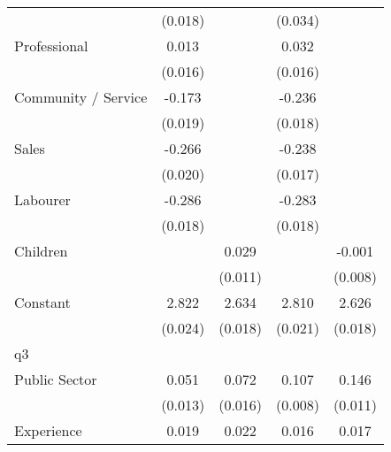 {\begin{tabular}{l*{4}{c}}
                    &     (0.018)         &                     &     (0.034)         &                     \\
[1em]
Professional        &       0.013         &                     &       0.032\sym{*}  &                     \\
                    &     (0.016)         &                     &     (0.016)         &                     \\
[1em]
Community / Service &      -0.173\sym{***}&                     &      -0.236\sym{***}&                     \\
                    &     (0.019)         &                     &     (0.018)         &                     \\
[1em]
Sales               &      -0.266\sym{***}&                     &      -0.238\sym{***}&                     \\
                    &     (0.020)         &                     &     (0.017)         &                     \\
[1em]
Labourer            &      -0.286\sym{***}&                     &      -0.283\sym{***}&                     \\
                    &     (0.018)         &                     &     (0.018)         &                     \\
[1em]
Children            &                     &       0.029\sym{**} &                     &      -0.001         \\
                    &                     &     (0.011)         &                     &     (0.008)         \\
[1em]
Constant            &       2.822\sym{***}&       2.634\sym{***}&       2.810\sym{***}&       2.626\sym{***}\\
                    &     (0.024)         &     (0.018)         &     (0.021)         &     (0.018)         \\
\hline
q3                  &                     &                     &                     &                     \\
Public Sector       &       0.051\sym{***}&       0.072\sym{***}&       0.107\sym{***}&       0.146\sym{***}\\
                    &     (0.013)         &     (0.016)         &     (0.008)         &     (0.011)         \\
[1em]
Experience          &       0.019\sym{***}&       0.022\sym{***}&       0.016\sym{***}&       0.017\sym{***}\\

\end{tabular}}

